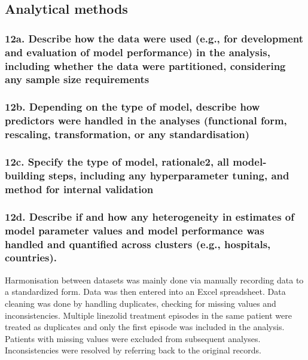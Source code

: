 \documentclass[
  letterpaper,
  DIV=11,
  numbers=noendperiod]{scrartcl}
\begin{document}
\subsection{Analytical methods}\label{analytical-methods}

\subsubsection{12a. Describe how the data were used (e.g., for
development and evaluation of model performance) in the analysis,
including whether the data were partitioned, considering any sample size
requirements}\label{a.-describe-how-the-data-were-used-e.g.-for-development-and-evaluation-of-model-performance-in-the-analysis-including-whether-the-data-were-partitioned-considering-any-sample-size-requirements}

\subsubsection{12b. Depending on the type of model, describe how
predictors were handled in the analyses (functional form, rescaling,
transformation, or any
standardisation)}\label{b.-depending-on-the-type-of-model-describe-how-predictors-were-handled-in-the-analyses-functional-form-rescaling-transformation-or-any-standardisation}

\subsubsection{12c. Specify the type of model, rationale2, all
model-building steps, including any hyperparameter tuning, and method
for internal
validation}\label{c.-specify-the-type-of-model-rationale2-all-model-building-steps-including-any-hyperparameter-tuning-and-method-for-internal-validation}

\subsubsection{12d. Describe if and how any heterogeneity in estimates
of model parameter values and model performance was handled and
quantified across clusters (e.g., hospitals,
countries).}\label{d.-describe-if-and-how-any-heterogeneity-in-estimates-of-model-parameter-values-and-model-performance-was-handled-and-quantified-across-clusters-e.g.-hospitals-countries.}

Harmonisation between datasets was mainly done via manually recording
data to a standardized form. Data was then entered into an Excel
spreadsheet. Data cleaning was done by handling duplicates, checking for
missing values and inconsistencies. Multiple linezolid treatment
episodes in the same patient were treated as duplicates and only the
first episode was included in the analysis. Patients with missing values
were excluded from subsequent analyses. Inconsistencies were resolved by
referring back to the original records.
\end{document}
